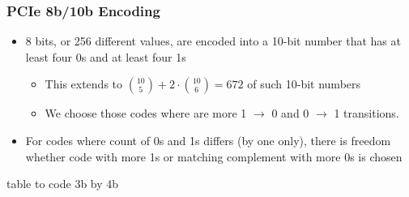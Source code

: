 \documentclass{beamer}
\begin{document}
\begin{frame}
\frametitle{PCIe 8b/10b Encoding}

\begin{itemize}
\item 8 bits, or 256 different values, are encoded into a 10-bit number that has at least four 0s and at least four 1s
\begin{itemize}
\item This extends to ${10 \choose 5} + 2\cdot {10 \choose 6}= 672$ of such 10-bit numbers
\item We choose those codes where are more 1 $\rightarrow$ 0 and 0 $\rightarrow$ 1 transitions.
\end{itemize}
\item For codes where count of 0s and 1s differs (by one only), there is freedom whether code with more 1s or matching complement with more 0s is chosen
\end{itemize}

\bigskip
table to code 3b by 4b
\end{frame}
\end{document}
